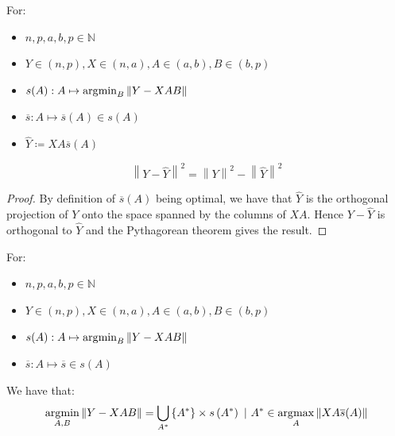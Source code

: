 \begin{lemma}\label{lemma:optimal_projection}

For:

\begin{itemize}
\item
  \(n,p,a,b,p \in \mathbb{N}\)
\item
  \(Y \in (n,p),X \in (n,a),A \in (a,b),B \in (b,p)\)
\item
  \(s(A):A \mapsto \operatorname*{\arg\!\min}_{B}\left\| {Y - XAB} \right\|\)
\item
  \(\overline{s}:A \mapsto \overline{s}(A) \in s(A)\)
\item
  \(\hat{Y} \coloneqq XA\overline{s}(A)\)
\end{itemize}

\[\left\| {Y - \hat{Y}} \right\|^{2} = \left\| Y \right\|^{2} - \left\| \hat{Y} \right\|^{2}\]

\end{lemma}

\begin{proof}

By definition of \(\overline{s}(A)\) being optimal, we have that
\(\hat{Y}\) is the orthogonal projection of \(Y\) onto the space spanned
by the columns of \(XA\). Hence \(Y - \hat{Y}\) is orthogonal to
\(\hat{Y}\) and the Pythagorean theorem gives the result.

\end{proof}

\begin{theorem}\label{theorem:separable_optimization}

For:

\begin{itemize}
\item
  \(n,p,a,b,p \in \mathbb{N}\)
\item
  \(Y \in (n,p),X \in (n,a),A \in (a,b),B \in (b,p)\)
\item
  \(s(A):A \mapsto \operatorname*{\arg\!\min}_{B}\left\| {Y - XAB} \right\|\)
\item
  \(\overline{s}:A \mapsto \overline{s} \in s(A)\)
\end{itemize}

We have that:
\[\operatorname*{\arg\!\min}_{A,B}\left\| {Y - XAB} \right\| = \bigcup_{A^{\ast}}\left\{ A^{\ast} \right\} \times s\left( A^{\ast} \right)~|~A^{\ast} \in \operatorname*{\arg\!\max}_{A}\left\| {XA\overline{s}(A)} \right\|\]

\end{theorem}


